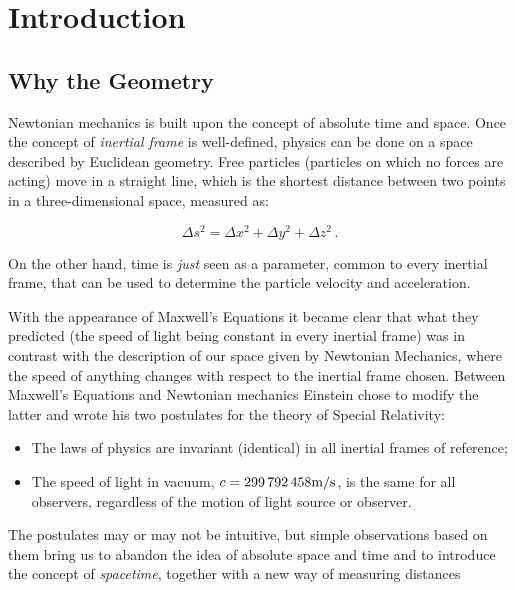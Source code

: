 \section{Introduction}

\subsection{Why the \Sh Geometry}

Newtonian mechanics is built upon the concept of absolute time and space.
Once the concept of \textit{inertial frame} is well-defined, physics can be
done on a space described by Euclidean geometry.
Free particles (particles on which no forces are acting) move in a straight
line, which is the shortest distance between two points in a three-dimensional
space, measured as:

\begin{equation}
    \Delta s^2 = \Delta x^2 + \Delta y^2 + \Delta z^2 \, .
    \label{eq:euclide}
\end{equation}

On the other hand, time is \textit{just} seen as a parameter, common to every 
inertial frame, that can be used to determine the particle velocity and
acceleration.

With the appearance of Maxwell's Equations it became clear that what they 
predicted (the speed of light being constant in every inertial frame) was in
contrast with the description of our space given by Newtonian Mechanics, where
the speed of anything changes with respect to the inertial frame chosen.
Between Maxwell's Equations and Newtonian mechanics Einstein chose to modify 
the latter and wrote his two postulates for the theory of Special Relativity:

\begin{itemize}
    \item The laws of physics are invariant (identical) in all inertial frames
        of reference;
    \item The speed of light in vacuum,
        $c = \num{299792458} \unit[per-mode = symbol]{\meter\per\second}$,
        is the same for all observers, regardless of the motion of light source
        or observer.
\end{itemize}

The postulates may or may not be intuitive, but simple observations based on
them bring us to abandon the idea of absolute space and time and to introduce
the concept of \textit{spacetime}, together with a new way of measuring
distances

